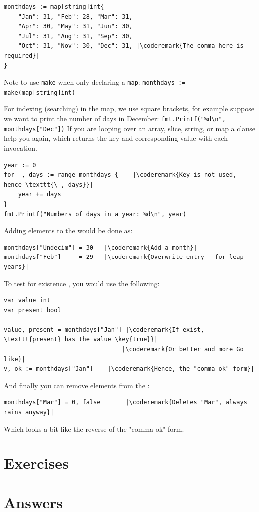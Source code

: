 \begin{lstlisting}
monthdays := map[string]int{
	"Jan": 31, "Feb": 28, "Mar": 31, 
	"Apr": 30, "May": 31, "Jun": 30, 
	"Jul": 31, "Aug": 31, "Sep": 30, 
	"Oct": 31, "Nov": 30, "Dec": 31, |\coderemark{The comma here is required}|
}		    
\end{lstlisting}
Note to use \lstinline{make} when only declaring a \lstinline{map}:
\lstinline|monthdays := make(map[string]int)|

For indexing (searching) in the map, we use square brackets, for example
suppose we want to print the
number of days in December: \lstinline{fmt.Printf("%d\n", monthdays["Dec"])}\newline
If you are looping over an array, slice, string, or map a
clause help you again, which returns the key and corresponding value
with each invocation.
\begin{lstlisting}
year := 0
for _, days := range monthdays {    |\coderemark{Key is not used, hence \texttt{\_, days}}|
    year += days
}
fmt.Printf("Numbers of days in a year: %d\n", year)
\end{lstlisting}
Adding elements to the   would be done as:
\begin{lstlisting}
monthdays["Undecim"] = 30	|\coderemark{Add a month}|
monthdays["Feb"]     = 29	|\coderemark{Overwrite entry - for leap years}|
\end{lstlisting}
To test for existence , you would use the
following\cite{go_course_day2}:
\begin{lstlisting}
var value int
var present bool

value, present = monthdays["Jan"] |\coderemark{If exist, \texttt{present} has the value \key{true}}|
                                 |\coderemark{Or better and more Go like}|
v, ok := monthdays["Jan"]	 |\coderemark{Hence, the "comma ok" form}|
\end{lstlisting}
And finally you can remove elements  from the :
\begin{lstlisting}
monthdays["Mar"] = 0, false       |\coderemark{Deletes "Mar", always rains anyway}|
\end{lstlisting}
Which looks a bit like the reverse of the "comma ok" form.

\section{Exercises}








\cleardoublepage
\section{Answers}
\shipoutAnswer
